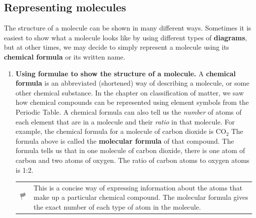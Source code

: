             \subsection{ Representing molecules}
            \nopagebreak
        \label{m38120*id307557}The structure of a molecule can be shown in many 
different ways. Sometimes it is easiest to show what a molecule looks like by 
using different types of \textbf{diagrams}, but at 
other times, we may decide to simply represent a molecule using its \textbf{chemical formula} or its written name.\par 
        \label{m38120*id307573}\begin{enumerate}[noitemsep, label=\textbf{\arabic*}. ] 
            \label{m38120*uid2}\item \textbf{Using formulae to show the structure of a 
molecule.}
A \textbf{chemical formula} is an abbreviated 
(shortened) way of describing a molecule, or some other chemical substance. In 
the chapter on classification of matter, we saw how chemical compounds can be 
represented using element symbols from the Periodic Table. A chemical formula 
can also tell us the \textsl{number} of atoms of 
each element that are in a molecule and their \textsl{ratio} in that molecule.
For example, the chemical formula for a molecule of carbon dioxide is
${\mathrm{CO}}_{2}$
The formula above is called the \textbf{molecular 
formula} of that compound. The formula tells us that in one molecule 
of carbon dioxide, there is one atom of carbon and two atoms of oxygen. The 
ratio of carbon atoms to oxygen atoms is 1:2.
\vspace{\rubberspace}\par
        \label{m38120*fhsst!!!underscore!!!id87}\begin{definition}
	  \begin{tabular*}{15 cm}{m{15 mm}m{}}
	\hspace*{-50pt}  \includegraphics[width=0.5in]{col11305.imgs/psflag2.png}   & \Definition{   \label{id2456697}\textbf{ Molecular formula }} { \label{m38120*meaningfhsst!!!underscore!!!id87}
This is a concise way of expressing information about the atoms that make up a 
particular chemical compound. The molecular formula gives the exact number of 
each type of atom in the molecule. 
 } 
      \end{tabular*}
      \end{definition}

\end{enumerate}

